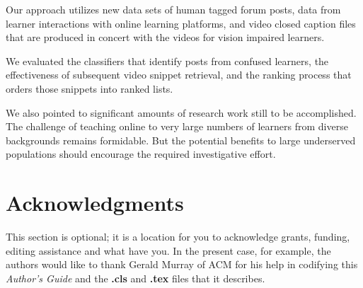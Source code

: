 \documentclass{edm_template}
\begin{document}
Our approach utilizes new data sets of human tagged forum posts, data
from learner interactions with online learning platforms, and video
closed caption files that are produced in concert with the videos for
vision impaired learners.

We evaluated the classifiers that identify posts from confused
learners, the effectiveness of subsequent video snippet retrieval, and
the ranking process that orders those snippets into ranked lists.

We also pointed to significant amounts of research work still to be
accomplished. The challenge of teaching online to very large numbers
of learners from diverse backgrounds remains formidable. But the
potential benefits to large underserved populations should encourage
the required investigative effort.


\section{Acknowledgments}
This section is optional\cite{wen2014sentiment}; it is a location for you
to acknowledge grants, funding, editing assistance and
what have you.  In the present case, for example, the
authors would like to thank Gerald Murray of ACM for
his help in codifying this \textit{Author's Guide}
and the \textbf{.cls} and \textbf{.tex} files that it describes.

%

%
%
\balancecolumns
\end{document}
